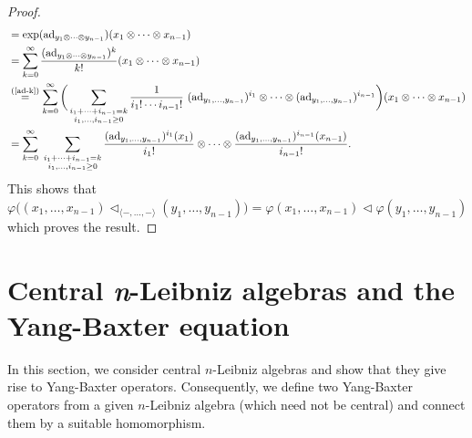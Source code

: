 \documentclass[a4paper,reqno,10pt]{amsart}
\theoremstyle{plain}
\theoremstyle{definition}
\theoremstyle{remark}
\begin{document}
\begin{proof}
\begin{align*}
        &= \mathrm{exp} (\mathrm{ad}_{y_1 \otimes \cdots \otimes y_{n-1}}) (x_1 \otimes \cdots \otimes x_{n-1})\\
        &= \sum_{k=0}^\infty \frac{  (\mathrm{ad}_{y_1 \otimes \cdots \otimes y_{n-1}})^k}{k!} (x_1 \otimes \cdots \otimes x_{n-1})\\
        &\stackrel{\textnormal{(\ref{ad-k})}}{=} \sum_{k=0}^\infty \bigg(  \sum_{\substack{ i_1 + \cdots + i_{n-1} = k \\ i_1, \ldots, i_{n-1} \geq 0}} \frac{1}{i_1 ! \cdots i_{n-1}!} ~ (\mathrm{ad}_{y_1, \ldots, y_{n-1}})^{i_1} \otimes \cdots \otimes  (\mathrm{ad}_{y_1, \ldots, y_{n-1}})^{i_{n-1}} \bigg) (x_1 \otimes \cdots \otimes x_{n-1})\\
        &= \sum_{k=0}^\infty ~ \sum_{\substack{ i_1 + \cdots + i_{n-1} = k \\ i_1, \ldots, i_{n-1} \geq 0}} \frac{ (\mathrm{ad}_{y_1, \ldots, y_{n-1}})^{i_1} (x_1) }{i_1 !} \otimes \cdots \otimes \frac{ (\mathrm{ad}_{y_1, \ldots, y_{n-1}})^{i_{n-1}} (x_{n-1}) }{i_{n-1} !}.
    \end{align*}
    This shows that $ \varphi \big( (x_1, \ldots, x_{n-1}) \triangleleft_{ \langle -, \ldots, - \rangle } (y_1, \ldots, y_{n-1})   \big) = \varphi (x_1, \ldots, x_{n-1}) \triangleleft \varphi (y_1, \ldots, y_{n-1})$ which proves the result.
\end{proof}



\section{Central {\em n}-Leibniz algebras and the Yang-Baxter equation}\label{sec3}

In this section, we consider central $n$-Leibniz algebras and show that they give rise to Yang-Baxter operators. Consequently, we define two Yang-Baxter operators from a given $n$-Leibniz algebra (which need not be central) and connect them by a suitable homomorphism.

\medskip
\end{document}

